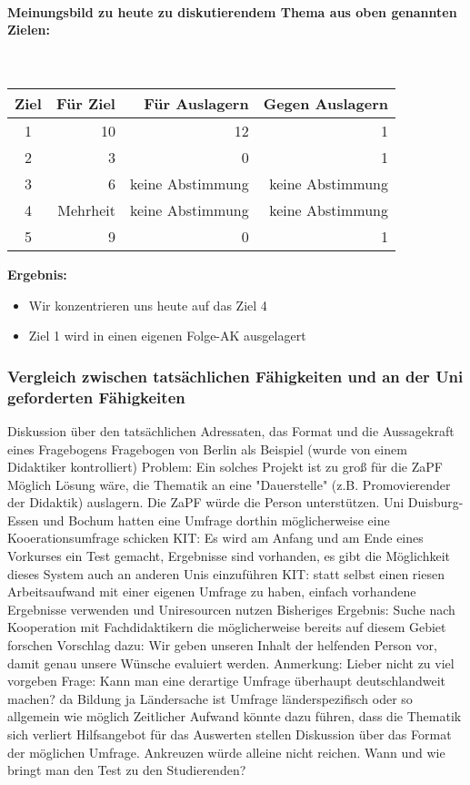 			\paragraph{Meinungsbild zu heute zu diskutierendem Thema aus oben genannten Zielen:}\\
				\begin{tabular}{c|r|r|r}
					Ziel & Für Ziel	& Für Auslagern	& Gegen Auslagern  \\ \hline
					1 &	10 & 12	& 1 \\
					2	& 3	& 0	& 1 \\
					3	& 6	& keine Abstimmung & keine Abstimmung \\
					4 &	Mehrheit & keine Abstimmung &	keine Abstimmung \\
					5 &	9	& 0	& 1
				\end{tabular}

				\textbf{Ergebnis:}
				\begin{itemize}
					\item Wir konzentrieren uns heute auf das Ziel 4
					\item Ziel 1 wird in einen eigenen Folge-AK ausgelagert
				\end{itemize}

		\subsubsection*{Vergleich zwischen tatsächlichen Fähigkeiten und an der Uni geforderten Fähigkeiten}
			\begin{outline}
				\1 Diskussion über den tatsächlichen Adressaten, das Format und die Aussagekraft eines Fragebogens
				\1 Fragebogen von Berlin als Beispiel (wurde von einem Didaktiker kontrolliert)
				\1 Problem: Ein solches Projekt ist zu groß für die ZaPF
					\2 Möglich Lösung wäre, die Thematik an eine "Dauerstelle" (z.B. Promovierender der Didaktik) auslagern. Die ZaPF würde die Person unterstützen.
					\2 Uni Duisburg-Essen und Bochum hatten eine Umfrage dorthin möglicherweise eine Kooerationsumfrage schicken
					\2 KIT: Es wird am Anfang und am Ende eines Vorkurses ein Test gemacht, Ergebnisse sind vorhanden, es gibt die Möglichkeit dieses System auch an anderen Unis einzuführen
					\2 KIT: statt selbst einen riesen Arbeitsaufwand mit einer eigenen Umfrage zu haben, einfach vorhandene Ergebnisse verwenden und Uniresourcen nutzen
					\2 Bisheriges Ergebnis: Suche nach Kooperation mit Fachdidaktikern die möglicherweise bereits auf diesem Gebiet forschen
					\2 Vorschlag dazu: Wir geben unseren Inhalt der helfenden Person vor, damit genau unsere Wünsche evaluiert werden.
						\3 Anmerkung: Lieber nicht zu viel vorgeben
				\1 Frage: Kann man eine derartige Umfrage überhaupt deutschlandweit machen? da Bildung ja Ländersache ist
					\2 Umfrage länderspezifisch oder so allgemein wie möglich
					\2 Zeitlicher Aufwand könnte dazu führen, dass die Thematik sich verliert
				\1 Hilfsangebot für das Auswerten stellen
				\1 Diskussion über das Format der möglichen Umfrage. Ankreuzen würde alleine nicht reichen.
				\1 Wann und wie bringt man den Test zu den Studierenden?
			\end{outline}

